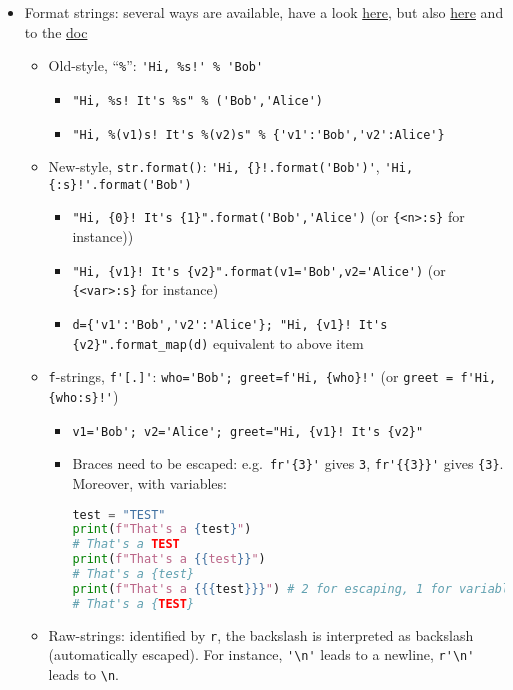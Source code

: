 \documentclass[a4paper,12pt,%
              final%
              ]{article}
\begin{document}
\begin{itemize}
  \item Format strings: several ways are available, have a look \href{https://realpython.com/python-string-formatting/}{here}, but also \href{https://pyformat.info/}{here} and to the \href{https://docs.python.org/3.10/library/string.html#format-string-syntax}{doc}
    \begin{itemize}
      \item Old-style, ``\verb|%|'': \verb|'Hi, %s!' % 'Bob'|
        \begin{itemize}
          \item \verb|"Hi, %s! It's %s" % ('Bob','Alice')|
          \item \verb|"Hi, %(v1)s! It's %(v2)s" % {'v1':'Bob','v2':Alice'}|
        \end{itemize}
      \item New-style, \verb|str.format()|: \verb|'Hi, {}!.format('Bob')'|, \verb|'Hi, {:s}!'.format('Bob')|
        \begin{itemize}
          \item \verb|"Hi, {0}! It's {1}".format('Bob','Alice')| (or \verb|{<n>:s}| for instance))
          \item \verb|"Hi, {v1}! It's {v2}".format(v1='Bob',v2='Alice')| (or \verb|{<var>:s}| for instance)
          \item \verb|d={'v1':'Bob','v2':'Alice'}; "Hi, {v1}! It's {v2}".format_map(d)| equivalent to above item
        \end{itemize}
      \item \texttt{f}-strings, \verb|f'[.]'|: \verb|who='Bob'; greet=f'Hi, {who}!'| (or \verb|greet = f'Hi, {who:s}!'|)
        \begin{itemize}
          \item \verb|v1='Bob'; v2='Alice'; greet="Hi, {v1}! It's {v2}"|
          \item Braces need to be escaped: e.g.\ \verb|fr'{3}'| gives \verb|3|,  \verb|fr'{{3}}'| gives \verb|{3}|. Moreover, with variables:
\begin{lstlisting}[language=python]
test = "TEST"
print(f"That's a {test}")
# That's a TEST
print(f"That's a {{test}}")
# That's a {test}
print(f"That's a {{{test}}}") # 2 for escaping, 1 for variable
# That's a {TEST}
\end{lstlisting}
        \end{itemize}
      \item Raw-strings: identified by \texttt{r}, the backslash is interpreted as backslash (automatically escaped). For instance, \verb|'\n'| leads to a newline, \verb|r'\n'| leads to \verb|\n|.

\end{itemize}
\end{itemize}
\end{document}
